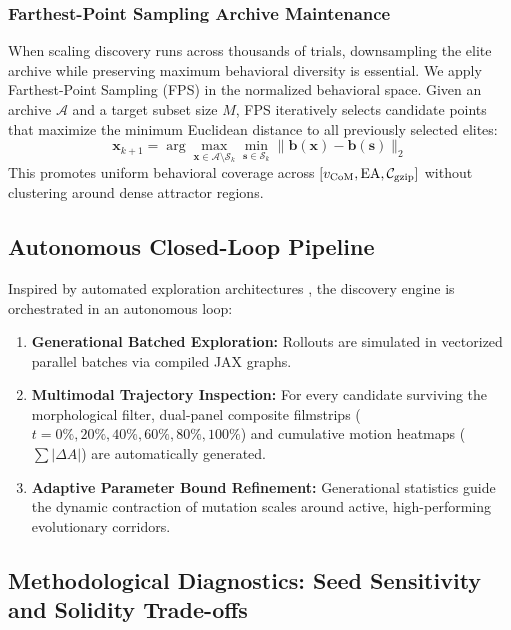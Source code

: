 \subsubsection{Farthest-Point Sampling Archive Maintenance}
When scaling discovery runs across thousands of trials, downsampling the elite archive while preserving maximum behavioral diversity is essential. We apply Farthest-Point Sampling (FPS) in the normalized behavioral space. Given an archive $\mathcal{A}$ and a target subset size $M$, FPS iteratively selects candidate points that maximize the minimum Euclidean distance to all previously selected elites:
\begin{equation}
\mathbf{x}_{k+1} = \arg\max_{\mathbf{x} \in \mathcal{A} \setminus \mathcal{S}_k} \min_{\mathbf{s} \in \mathcal{S}_k} \|\mathbf{b}(\mathbf{x}) - \mathbf{b}(\mathbf{s})\|_2
\label{eq:fps_sampling}
\end{equation}
This promotes uniform behavioral coverage across $[v_{\text{CoM}}, \text{EA}, \mathcal{C}_{\text{gzip}}]$ without clustering around dense attractor regions.

\subsection{Autonomous Closed-Loop Pipeline}
\label{subsec:discovery_ai_scientist}

Inspired by automated exploration architectures \parencite{michel2025exploring, kumar2025asal}, the discovery engine is orchestrated in an autonomous loop:
\begin{enumerate}
    \item \textbf{Generational Batched Exploration:} Rollouts are simulated in vectorized parallel batches via compiled JAX graphs.
    \item \textbf{Multimodal Trajectory Inspection:} For every candidate surviving the morphological filter, dual-panel composite filmstrips ($t = 0\%, 20\%, 40\%, 60\%, 80\%, 100\%$) and cumulative motion heatmaps ($\sum |\Delta A|$) are automatically generated.
    \item \textbf{Adaptive Parameter Bound Refinement:} Generational statistics guide the dynamic contraction of mutation scales around active, high-performing evolutionary corridors.
\end{enumerate}

\subsection{Methodological Diagnostics: Seed Sensitivity and Solidity Trade-offs}
\label{subsec:discovery_theoretical_diagnostics}

